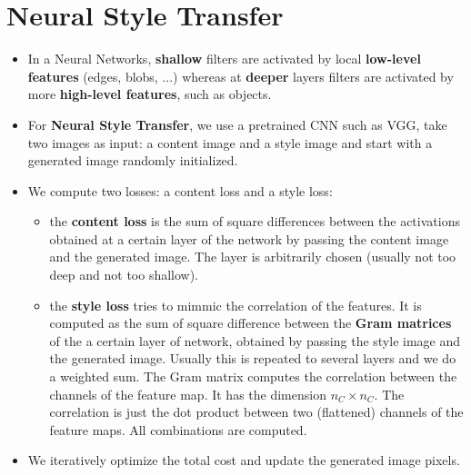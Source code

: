 \section{Neural Style Transfer}

\begin{itemize}
    \item In a Neural Networks, \textbf{shallow} filters are activated by local \textbf{low-level features} (edges, blobs, ...) whereas at \textbf{deeper} layers filters are activated by more \textbf{high-level features}, such as objects.
    \item For \textbf{Neural Style Transfer}, we use a pretrained CNN such as VGG, take two images as input: a content image and a style image and start with a generated image randomly initialized.
    \item We compute two losses: a content loss and a style loss:
    \begin{itemize}
    \item the \textbf{content loss} is the sum of square differences between the activations obtained at a certain layer of the network by passing the content image and the generated image. The layer is arbitrarily chosen (usually not too deep and not too shallow).
    \item the \textbf{style loss} tries to mimmic the correlation of the features. It is computed as the sum of square difference between the \textbf{Gram matrices} of the a certain layer of network, obtained by passing the style image and the generated image. Usually this is repeated to several layers and we do a weighted sum. The Gram matrix computes the correlation between the channels of the feature map. It has the dimension $n_C \times n_C$. The correlation is just the dot product between two (flattened) channels of the feature maps. All combinations are computed.
    \end{itemize}
    \item We iteratively optimize the total cost and update the generated image pixels.
\end{itemize}